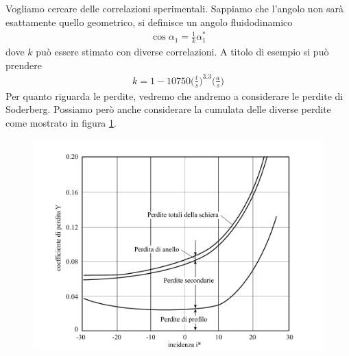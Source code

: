 Vogliamo cercare delle correlazioni sperimentali. Sappiamo che l'angolo non sarà esattamente quello geometrico, si definisce un angolo fluidodinamico
\begin{align*}
\cos \alpha_1 = \frac{1}{k} \alpha_1^*
\end{align*}
dove $k$ può essere stimato con diverse correlazioni. A titolo di esempio si può prendere
\begin{align*}
k = 1 - 10750 \bigg( \frac{t}{s} \bigg)^{3.3} \bigg( \frac{a}{s} \bigg)
\end{align*}
Per quanto riguarda le perdite, vedremo che andremo a considerare le perdite di Soderberg. Possiamo però anche considerare la cumulata delle diverse perdite come mostrato in figura \ref{fig:PerditeSchiera}. 
\begin{figure}
\centering
  \includegraphics[width=.65\textwidth]{fig/PerditeSchiera.pdf}
\caption{}
\label{fig:PerditeSchiera}
\end{figure}
